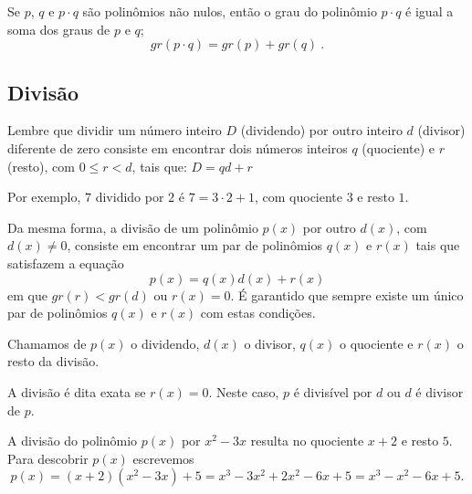   \begin{prop}
  Se $p$, $q$ e $p \cdot q$ são polinômios não nulos, então o grau do polinômio $p \cdot q$ é igual a soma dos graus de $p$ e $q$;
\begin{equation*}
gr(p \cdot q) = gr(p) + gr(q) \ .
\end{equation*}
  \end{prop}

\subsection{Divisão}

Lembre que dividir um número inteiro $D$ (dividendo) por outro inteiro $d$ (divisor) diferente de zero consiste em encontrar dois números inteiros $q$ (quociente) e $r$ (resto), com $0\leqslant r<d$, tais que:
$D=qd+r$

Por exemplo, $7$ dividido por $2$ é $7=3\cdot 2 +1$, com quociente $3$ e resto $1$.

Da mesma forma, a divisão de um polinômio $p(x)$ por outro $d(x)$, com $d(x)\neq 0$, consiste em encontrar um par de polinômios $q(x)$ e $r(x)$ tais que satisfazem a equação
\begin{equation*}
    p(x)=q(x) d(x) +r(x)
\end{equation*}
em que $gr(r)<gr(d)$ ou $r(x)=0$. É garantido que sempre existe um único par de polinômios $q(x)$ e $r(x)$ com estas condições.

Chamamos de $p(x)$ o dividendo, $d(x)$ o  divisor, $q(x)$ o quociente e $r(x)$ o resto da divisão.

\begin{obs}
    A divisão é dita exata se $r(x)=0$. Neste caso, $p$ é divisível por $d$ ou $d$ é divisor de $p$.
\end{obs}

\begin{exem}
    A divisão do polinômio $p(x)$ por $x^2-3x$ resulta no quociente $x+2$ e resto $5$. Para descobrir $p(x)$ escrevemos
    \begin{equation*}
        p(x)=(x+2)(x^2-3x)+5 = x^3-3x^2+2x^2-6x+5=x^3-x^2-6x+5.
    \end{equation*}
\end{exem}

